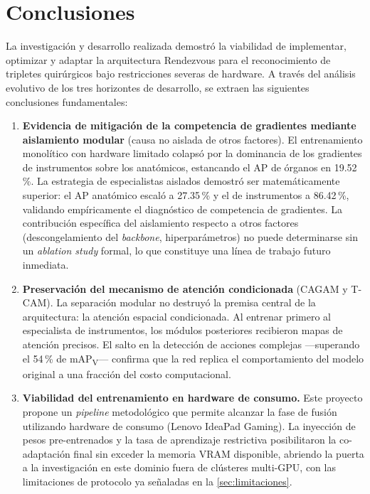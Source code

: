 \documentclass[11pt]{article}
\begin{document}
\section{Conclusiones}
\label{sec:conclusiones}

La investigación y desarrollo realizada demostró la viabilidad de implementar, optimizar y adaptar la arquitectura Rendezvous para el reconocimiento de tripletes quirúrgicos bajo restricciones severas de hardware. A través del análisis evolutivo de los tres horizontes de desarrollo, se extraen las siguientes conclusiones fundamentales:

\begin{enumerate}[leftmargin=1.6em]
    \item \textbf{Evidencia de mitigación de la competencia de gradientes mediante aislamiento modular} (causa no aislada de otros factores). El entrenamiento monolítico con hardware limitado colapsó por la dominancia de los gradientes de instrumentos sobre los anatómicos, estancando el AP de órganos en 19.52\,\%. La estrategia de especialistas aislados demostró ser matemáticamente superior: el AP anatómico escaló a 27.35\,\% y el de instrumentos a 86.42\,\%, validando empíricamente el diagnóstico de competencia de gradientes. La contribución específica del aislamiento respecto a otros factores (descongelamiento del \emph{backbone}, hiperparámetros) no puede determinarse sin un \emph{ablation study} formal, lo que constituye una línea de trabajo futuro inmediata.

    \item \textbf{Preservación del mecanismo de atención condicionada} (CAGAM y T-CAM). La separación modular no destruyó la premisa central de la arquitectura: la atención espacial condicionada. Al entrenar primero al especialista de instrumentos, los módulos posteriores recibieron mapas de atención precisos. El salto en la detección de acciones complejas —superando el 54\,\% de mAP\textsubscript{V}— confirma que la red replica el comportamiento del modelo original a una fracción del costo computacional.

    \item \textbf{Viabilidad del entrenamiento en hardware de consumo.} Este proyecto propone un \emph{pipeline} metodológico que permite alcanzar la fase de fusión utilizando hardware de consumo (Lenovo IdeaPad Gaming). La inyección de pesos pre-entrenados y la tasa de aprendizaje restrictiva posibilitaron la co-adaptación final sin exceder la memoria VRAM disponible, abriendo la puerta a la investigación en este dominio fuera de clústeres multi-GPU, con las limitaciones de protocolo ya señaladas en la \cref{sec:limitaciones}.


\end{enumerate}
\end{document}

